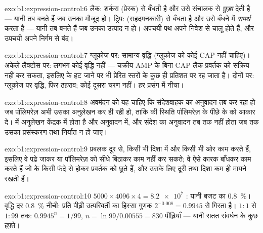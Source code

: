 \begin{solution}{exo:b1:expression-control:6}
लैक: शर्करा (प्रेरक)  से बँधती है और उसे संचालक से
\emph{छुड़ा} देती है --- यानी  तब बनते हैं जब उनका  मौजूद
हो। ट्रिप:  (सहदमनकारी)  से बँधता है और उसे बँधने में
\emph{समर्थ} करता है --- यानी  तब बनते हैं जब उनका उत्पाद
न हो। अपचयी पथ अपने निवेश से चालू होते हैं,
और उपचयी अपने निर्गम से बंद।
\end{solution}

\begin{solution}{exo:b1:expression-control:7}
ग्लूकोज पर: सामान्य वृद्धि (ग्लूकोज को कोई CAP नहीं चाहिए)। अकेले
लैक्टोस पर: लगभग कोई वृद्धि नहीं --- चक्रीय AMP के बिना CAP लैक
प्रवर्तक को सक्रिय नहीं कर सकता, इसलिए  के हट जाने पर भी 
प्रेरित स्तरों के कुछ ही प्रतिशत पर रह जाता है। दोनों पर: ग्लूकोज पर
वृद्धि, फिर ठहराव; कोई दूसरा चरण नहीं। हर प्रसंग में  नीचा।
\end{solution}

\begin{solution}{exo:b1:expression-control:8}
अवमंदन को यह चाहिए कि  संदेशवाहक का अनुवादन तब कर रहा हो जब
पॉलिमरेज़ अभी उसका अनुलेखन कर ही रही हो, ताकि  की
स्थिति पॉलिमरेज़ के पीछे के  को आकार दे।  में
अनुलेखन केंद्रक में होता है और अनुवादन  में, और
संदेश का अनुवादन तब तक नहीं होता जब तक उसका प्रसंस्करण तथा निर्यात न हो जाए।
\end{solution}

\begin{solution}{exo:b1:expression-control:9}
प्रबलक दूर से, किसी भी दिशा में और किसी भी ओर काम करते हैं, इसलिए वे
पढ़े जाकर या पॉलिमरेज़ को सीधे बिठाकर काम नहीं कर सकते; वे ऐसे कारक
बाँधकर काम करते हैं जो  के किसी फंदे से होकर प्रवर्तक को छूते हैं,
और उसके लिए दूरी तथा दिशा कम ही मायने रखती हैं।
\end{solution}

\begin{solution}{exo:b1:expression-control:10}
$5000\times 4096\times 4 = \num{8.2e7}$ : यानी बजट का \qty{0.8}{\%}।
वृद्धि दर \qty{0.8}{\%} नीची: प्रति पीढ़ी उत्परिवर्ती का
हिस्सा गुणक $2^{-0.008} = 0.9945$ से गिरता है। $1:1$ से
$1:99$ तक: $0.9945^n = 1/99$, $n = \ln 99/0.00555 = 830$ पीढ़ियाँ ---
यानी सतत संवर्धन के कुछ हफ़्ते।
\end{solution}

